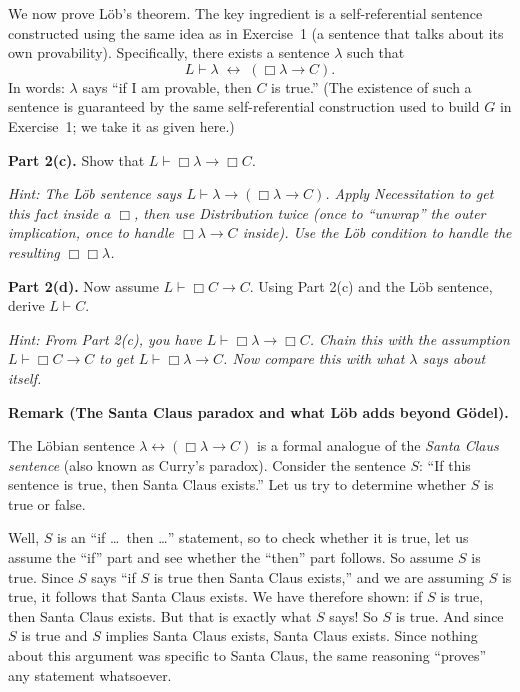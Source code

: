 \documentclass[8pt]{article}
\begin{document}
\bigskip
\noindent
We now prove L\"ob's theorem. The key ingredient is a self-referential sentence
constructed using the same idea as in Exercise~1 (a sentence that talks about its
own provability). Specifically, there exists a sentence $\lambda$ such that
\[
  L \vdash \lambda \;\leftrightarrow\; (\Box\lambda \to C).
\]
In words: $\lambda$ says ``if I am provable, then $C$ is true.'' (The existence of
such a sentence is guaranteed by the same self-referential construction used to build
$G$ in Exercise~1; we take it as given here.)

\medskip
\noindent
\textbf{Part 2(c).} Show that $L \vdash \Box\lambda \to \Box C$.

\medskip
\noindent
\emph{Hint: The L\"ob sentence says $L \vdash \lambda \to (\Box\lambda \to C)$.
Apply Necessitation to get this fact inside a $\Box$, then use Distribution twice
(once to ``unwrap'' the outer implication, once to handle $\Box\lambda \to C$
inside). Use the L\"ob condition to handle the resulting $\Box\Box\lambda$.}

\medskip
\noindent
\textbf{Part 2(d).} Now assume $L \vdash \Box C \to C$. Using Part 2(c) and the
L\"ob sentence, derive $L \vdash C$.

\medskip
\noindent
\emph{Hint: From Part 2(c), you have $L \vdash \Box\lambda \to \Box C$. Chain this
with the assumption $L \vdash \Box C \to C$ to get
$L \vdash \Box\lambda \to C$. Now compare this with what $\lambda$ says about
itself.}

\medskip
\noindent
\medskip
\noindent
\textbf{Remark (The Santa Claus paradox and what L\"ob adds beyond G\"odel).}

\medskip
\noindent
The L\"obian sentence $\lambda \leftrightarrow (\Box\lambda \to C)$ is a formal
analogue of the \emph{Santa Claus sentence} (also known as Curry's paradox). Consider
the sentence $S$: ``If this sentence is true, then Santa Claus exists.'' Let us try
to determine whether $S$ is true or false.

\medskip
\noindent
Well, $S$ is an ``if \ldots\ then \ldots'' statement, so to check whether it is true,
let us assume the ``if'' part and see whether the ``then'' part follows. So assume $S$
is true. Since $S$ says ``if $S$ is true then Santa Claus exists,'' and we are
assuming $S$ is true, it follows that Santa Claus exists. We have therefore shown: if
$S$ is true, then Santa Claus exists. But that is exactly what $S$ says! So $S$ is
true. And since $S$ is true and $S$ implies Santa Claus exists, Santa Claus exists.
Since nothing about this argument was specific to Santa Claus, the same reasoning
``proves'' any statement whatsoever.
\end{document}
